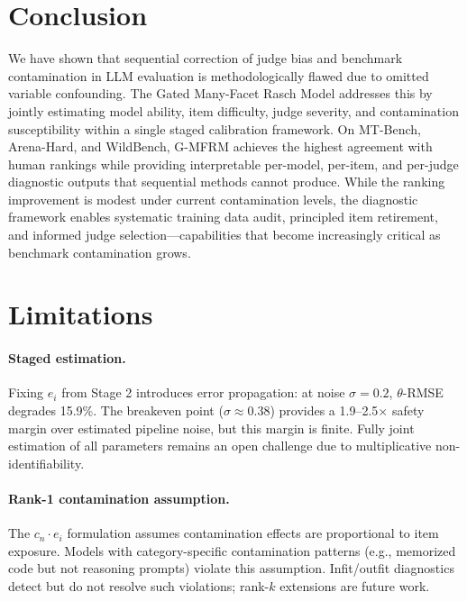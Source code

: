 \documentclass[11pt]{article}
\newcommand{\gmfrm}{G-MFRM}
\newcommand{\cn}{c_n}
\newcommand{\ei}{e_i}
\begin{document}
\section{Conclusion}

We have shown that sequential correction of judge bias and benchmark contamination in LLM evaluation is methodologically flawed due to omitted variable confounding.
The Gated Many-Facet Rasch Model addresses this by jointly estimating model ability, item difficulty, judge severity, and contamination susceptibility within a single staged calibration framework.
On MT-Bench, Arena-Hard, and WildBench, \gmfrm{} achieves the highest agreement with human rankings while providing interpretable per-model, per-item, and per-judge diagnostic outputs that sequential methods cannot produce.
While the ranking improvement is modest under current contamination levels, the diagnostic framework enables systematic training data audit, principled item retirement, and informed judge selection---capabilities that become increasingly critical as benchmark contamination grows.

\section*{Limitations}
\label{sec:limitations}

\paragraph{Staged estimation.}
Fixing $\ei$ from Stage 2 introduces error propagation: at noise $\sigma = 0.2$, $\theta$-RMSE degrades 15.9\%.
The breakeven point ($\sigma \approx 0.38$) provides a 1.9--2.5$\times$ safety margin over estimated pipeline noise, but this margin is finite.
Fully joint estimation of all parameters remains an open challenge due to multiplicative non-identifiability.

\paragraph{Rank-1 contamination assumption.}
The $\cn \cdot \ei$ formulation assumes contamination effects are proportional to item exposure.
Models with category-specific contamination patterns (e.g., memorized code but not reasoning prompts) violate this assumption.
Infit/outfit diagnostics detect but do not resolve such violations; rank-$k$ extensions are future work.
\end{document}
